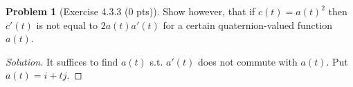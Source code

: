 \documentclass{article}
\theoremstyle{definition}
\newtheorem{problem}{Problem}
\theoremstyle{plain}
\begin{document}
\begin{problem}[Exercise 4.3.3 (0 pts)]Show however, that if $c(t)=a(t)^2$ then $c'(t)$ is not equal to $2a(t)a'(t)$ for a certain quaternion-valued function $a(t)$.
\end{problem}
\begin{adjustwidth}{0.7cm}{}
\color{blue}
\begin{proof}[Solution]
It suffices to find $a(t)$ s.t. $a'(t)$ does not commute with $a(t)$. Put $a(t)=i+tj$.
\color{black}
\end{proof}
\end{adjustwidth}
\end{document}
